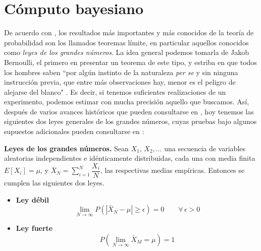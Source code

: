 \chapter{Cómputo bayesiano}

De acuerdo con \textcite{Ross10}, los resultados más importantes y más conocidos de la teoría de probabilidad son los llamados teoremas límite, en particular aquellos conocidos como \textit{leyes de los grandes números}. La idea general podemos tomarla de Jakob Bernoulli, el primero en presentar un teorema de este tipo, y estriba en que todos los hombres saben ``por algún instinto de la naturaleza \textit{per se} y sin ninguna instrucción previa, que entre más observaciones hay, menor es el peligro de alejarse del blanco" \parencite{Pulskamp09}. Es decir, si tenemos suficientes realizaciones de un experimento, podemos estimar con mucha precisión aquello que buscamos. Así, después de varios avances históricos que pueden consultarse en \textcite{Seneta13}, hoy tenemos las siguientes dos leyes generales de los grandes números, cuyas pruebas bajo algunos supuestos adicionales pueden consultarse en \textcite{Ross10}:

\begin{teo} \label{teo:LGN}
\textbf{Leyes de los grandes números.}
Sean $X_1,\,X_2,\dots$ una secuencia de variables aleatorias independientes e idénticamente distribuidas, cada una con media finita $E[X_i]=\mu$, y $\bar{X}_N=\sum\limits_{i=1}^N\dfrac{X_i}{N}$, las respectivas medias empíricas. Entonces se cumplen las siguientes dos leyes.\\ 
\begin{itemize}
\item \textbf{Ley débil}
\begin{equation*}
\lim_{N \to \infty} P\left( |\bar{X}_N-\mu| \geq \epsilon \right)  = 0 \qquad \forall \, \epsilon > 0
\end{equation*}
\item \textbf{Ley fuerte}
\begin{equation*}
P\left(\lim_{N \to \infty} \bar{X}_M = \mu \right)  = 1 
\end{equation*}
\end{itemize}
\end{teo}

